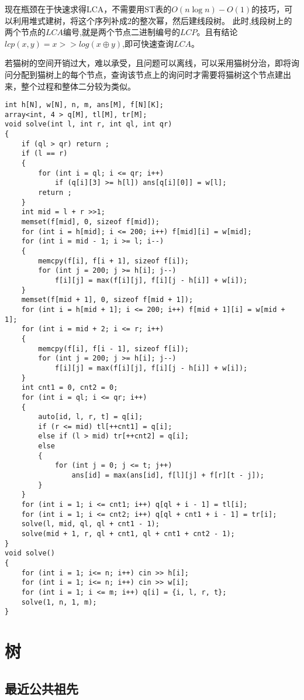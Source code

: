 \documentclass[a4paper, fontset=none]{ctexart}
\begin{document}
现在瓶颈在于快速求得$\text{LCA}$，不需要用$\text{ST}$表的$O(n\log n)-O(1)$的技巧，可以利用堆式建树，将这个序列补成$2$的整次幂，然后建线段树。
此时,线段树上的两个节点的$LCA$编号,就是两个节点二进制编号的$LCP$。且有结论$lcp(x, y)=x >> log(x\oplus y)$,即可快速查询$LCA$。

若猫树的空间开销过大，难以承受，且问题可以离线，可以采用猫树分治，即将询问分配到猫树上的每个节点，查询该节点上的询问时才需要将猫树这个节点建出来，整个过程和整体二分较为类似。
\begin{verbatim}
int h[N], w[N], n, m, ans[M], f[N][K];
array<int, 4 > q[M], tl[M], tr[M];
void solve(int l, int r, int ql, int qr)
{
    if (ql > qr) return ;
    if (l == r)
    {
        for (int i = ql; i <= qr; i++)
            if (q[i][3] >= h[l]) ans[q[i][0]] = w[l];
        return ;
    }
    int mid = l + r >>1;
    memset(f[mid], 0, sizeof f[mid]);
    for (int i = h[mid]; i <= 200; i++) f[mid][i] = w[mid];
    for (int i = mid - 1; i >= l; i--)
    {
        memcpy(f[i], f[i + 1], sizeof f[i]);
        for (int j = 200; j >= h[i]; j--)
            f[i][j] = max(f[i][j], f[i][j - h[i]] + w[i]);
    }
    memset(f[mid + 1], 0, sizeof f[mid + 1]);
    for (int i = h[mid + 1]; i <= 200; i++) f[mid + 1][i] = w[mid + 1];
    for (int i = mid + 2; i <= r; i++)
    {
        memcpy(f[i], f[i - 1], sizeof f[i]);
        for (int j = 200; j >= h[i]; j--)
            f[i][j] = max(f[i][j], f[i][j - h[i]] + w[i]);
    }
    int cnt1 = 0, cnt2 = 0;
    for (int i = ql; i <= qr; i++)
    {
        auto[id, l, r, t] = q[i];
        if (r <= mid) tl[++cnt1] = q[i];
        else if (l > mid) tr[++cnt2] = q[i];
        else
        {
            for (int j = 0; j <= t; j++)
                ans[id] = max(ans[id], f[l][j] + f[r][t - j]);
        }
    }
    for (int i = 1; i <= cnt1; i++) q[ql + i - 1] = tl[i];
    for (int i = 1; i <= cnt2; i++) q[ql + cnt1 + i - 1] = tr[i];
    solve(l, mid, ql, ql + cnt1 - 1);
    solve(mid + 1, r, ql + cnt1, ql + cnt1 + cnt2 - 1);
}
void solve()
{
    for (int i = 1; i<= n; i++) cin >> h[i];
    for (int i = 1; i<= n; i++) cin >> w[i];
    for (int i = 1; i <= m; i++) q[i] = {i, l, r, t};
    solve(1, n, 1, m);
}
\end{verbatim}

\section{树}
\subsection{最近公共祖先}
\end{document}
